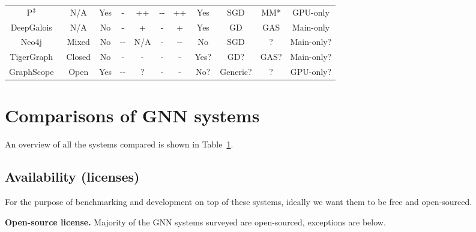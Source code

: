 \begin{table}[h]
{{\begin{tabular}{@{}ccccccccccc@{}}
P$^{3}$~\cite{pcube}           & N/A                      & Yes                  & -             & ++            & -{}-       & ++      & Yes              & SGD          & MM*                             & GPU-only                                              \\
DeepGalois~\cite{deepgalois}        & N/A                      & No                   & -             & +             & -        & +       & Yes              & GD           & GAS                             & Main-only                                             \\
Neo4j~\cite{neo4j}             & Mixed                    & No                   & -{}-            & N/A           & -        & -{}-      & No               & SGD          & ?                               & Main-only?                                            \\
TigerGraph~\cite{tigergraph}        & Closed                   & No                   & -             & -             & -        & -       & Yes?             & GD?          & GAS?                            & Main-only?                                            \\
GraphScope~\cite{graphscope}        & Open                     & Yes                  & -{}-            & ?             & -        & -       & No?              & Generic?     & ?                               & GPU-only?                                             \\ \bottomrule
\end{tabular}
}
}
\label{tab:comp}
\end{table}

\vspace{-2mm}
\section{Comparisons of GNN systems}
An overview of all the systems compared is shown in Table~\ref{tab:comp}.
\label{sec:comp}
\subsection{Availability (licenses)}
For the purpose of benchmarking and development on top of these systems, ideally we want them to be free and open-sourced.


\vspace{2mm}
\noindent \textbf{Open-source license.}
Majority of the GNN systems surveyed are open-sourced, exceptions are below.



